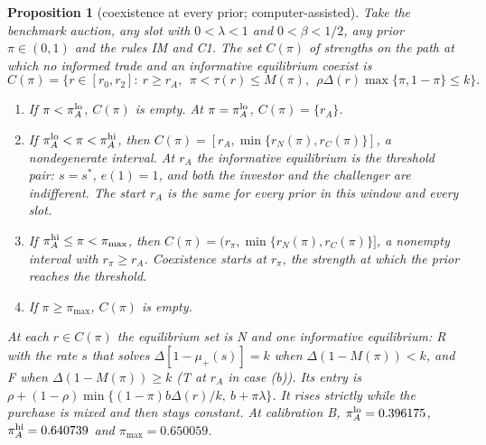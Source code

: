 \documentclass[11pt]{article}
\newtheorem{proposition}{Proposition}
\theoremstyle{definition}
\begin{document}
\setcounter{proposition}{4}
\begin{proposition}[coexistence at every prior; computer-assisted]\label{prop:5}
Take the benchmark auction, any slot with $0<\lambda<1$ and $0<\beta<1/2$, any prior $\pi\in(0,1)$ and the rules IM
and C1. The set $C(\pi)$ of strengths on the path at which no informed trade and an informative equilibrium
coexist is
\[
C(\pi)=\big\{r\in[r_0,r_2]:\ r\ge r_A,\ \ \pi<\tau(r)\le M(\pi),\ \ \rho\Delta(r)\max\{\pi,1-\pi\}\le k\big\}.
\]
\begin{enumerate}[label=(\alph*)]
\item If $\pi<\pi_A^{\rm lo}$, $C(\pi)$ is empty. At $\pi=\pi_A^{\rm lo}$, $C(\pi)=\{r_A\}$.
\item If $\pi_A^{\rm lo}<\pi<\pi_A^{\rm hi}$, then $C(\pi)=[r_A,\min\{r_N(\pi),r_C(\pi)\}]$, a nondegenerate interval.
  At $r_A$ the informative equilibrium is the threshold pair: $s=s^*$, $e(1)=1$, and both the investor and the
  challenger are indifferent. The start $r_A$ is the same for every prior in this window and every slot.
\item If $\pi_A^{\rm hi}\le\pi<\pi_{\max}$, then $C(\pi)=(r_\pi,\min\{r_N(\pi),r_C(\pi)\}]$, a nonempty interval
  with $r_\pi\ge r_A$. Coexistence starts at $r_\pi$, the strength at which the prior reaches the threshold.
\item If $\pi\ge\pi_{\max}$, $C(\pi)$ is empty.
\end{enumerate}
At each $r\in C(\pi)$ the equilibrium set is N and one informative equilibrium: R with the rate $s$ that solves
$\Delta[1-\mu_+(s)]=k$ when $\Delta(1-M(\pi))<k$, and F when $\Delta(1-M(\pi))\ge k$ (T at $r_A$ in case (b)).
Its entry is $\rho+(1-\rho)\min\{(1-\pi)b\Delta(r)/k,\ b+\pi\lambda\}$. It rises strictly while the purchase is mixed
and then stays constant. At calibration B, $\pi_A^{\rm lo}=0.396175$, $\pi_A^{\rm hi}=0.640739$ and
$\pi_{\max}=0.650059$.
\end{proposition}
\end{document}
